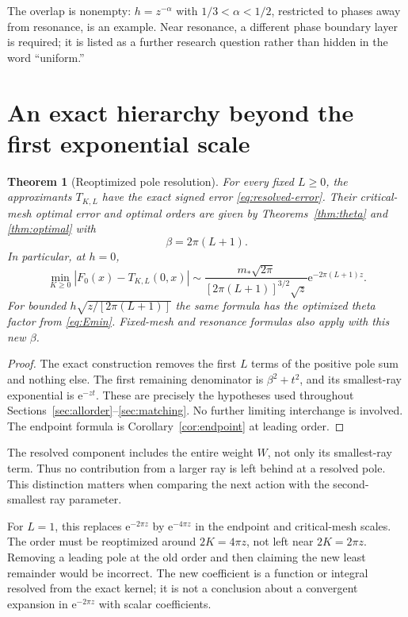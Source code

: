\documentclass[11pt,a4paper]{article}
\numberwithin{equation}{section}
\newtheorem{theorem}{Theorem}[section]
\theoremstyle{definition}\newtheorem{definition}[theorem]{Definition}
\theoremstyle{remark}\newtheorem{remark}[theorem]{Remark}
\newcommand{\e}{\mathrm e}
\newcommand{\mstar}{m_*}
\begin{document}
The overlap is nonempty: $h=z^{-\alpha}$ with
$1/3<\alpha<1/2$, restricted to phases away from resonance, is an example.
Near resonance, a different phase boundary layer is required; it is
listed as a further research question rather than hidden in the word
``uniform.''

\section{An exact hierarchy beyond the first exponential scale}
\label{sec:hierarchy}

\begin{theorem}[Reoptimized pole resolution]
\label{thm:hierarchy}
For every fixed $L\ge0$, the approximants $T_{K,L}$ have the exact signed
error \eqref{eq:resolved-error}. Their critical-mesh optimal error and
optimal orders are given by Theorems~\ref{thm:theta} and
\ref{thm:optimal} with
\begin{equation}
 \beta=2\pi(L+1).
 \label{eq:hierarchy-beta}
\end{equation}
In particular, at $h=0$,
\begin{equation}
 \min_{K\ge0}|F_0(x)-T_{K,L}(0,x)|
 \sim\frac{\mstar\sqrt{2\pi}}{[2\pi(L+1)]^{3/2}\sqrt z}
            \e^{-2\pi(L+1)z}.
 \label{eq:hierarchy-endpoint}
\end{equation}
For bounded $h\sqrt{z/[2\pi(L+1)]}$ the same formula has the optimized
theta factor from \eqref{eq:Emin}. Fixed-mesh and resonance formulas also
apply with this new $\beta$.
\end{theorem}
\begin{proof}
The exact construction removes the first $L$ terms of the positive pole
sum and nothing else. The first remaining denominator is $\beta^2+t^2$,
and its smallest-ray exponential is $\e^{-zt}$. These are precisely the
hypotheses used throughout Sections~\ref{sec:allorder}--\ref{sec:matching}.
No further limiting interchange is involved. The endpoint formula is
Corollary~\ref{cor:endpoint} at leading order.
\end{proof}

The resolved component includes the entire weight $W$, not only its
smallest-ray term. Thus no contribution from a larger ray is left behind
at a resolved pole. This distinction matters when comparing the next
action with the second-smallest ray parameter.

For $L=1$, this replaces $\e^{-2\pi z}$ by $\e^{-4\pi z}$ in the
endpoint and critical-mesh scales. The order must be reoptimized around
$2K=4\pi z$, not left near $2K=2\pi z$. Removing a leading pole at the
old order and then claiming the new least remainder would be incorrect.
The new coefficient is a function or integral resolved from the exact
kernel; it is not a conclusion about a convergent expansion in
$\e^{-2\pi z}$ with scalar coefficients.
\end{document}

